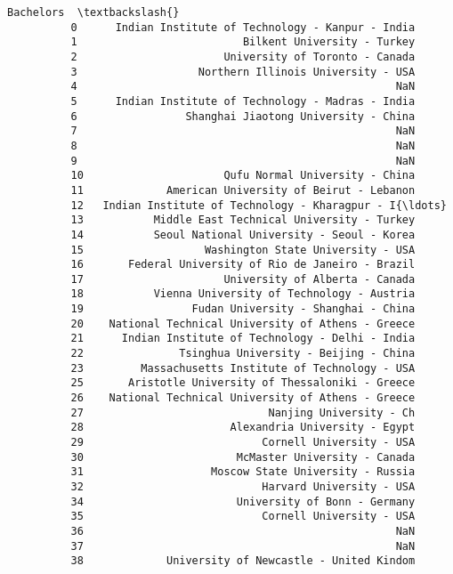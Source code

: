 \documentclass[11pt]{article}
\begin{document}
\begin{Verbatim}[commandchars=\\\{\}]
                                                       Bachelors  \textbackslash{}
          0      Indian Institute of Technology - Kanpur - India   
          1                          Bilkent University - Turkey   
          2                       University of Toronto - Canada   
          3                   Northern Illinois University - USA   
          4                                                  NaN   
          5      Indian Institute of Technology - Madras - India   
          6                 Shanghai Jiaotong University - China   
          7                                                  NaN   
          8                                                  NaN   
          9                                                  NaN   
          10                      Qufu Normal University - China   
          11             American University of Beirut - Lebanon   
          12   Indian Institute of Technology - Kharagpur - I{\ldots}   
          13           Middle East Technical University - Turkey   
          14           Seoul National University - Seoul - Korea   
          15                   Washington State University - USA   
          16       Federal University of Rio de Janeiro - Brazil   
          17                      University of Alberta - Canada   
          18           Vienna University of Technology - Austria   
          19                 Fudan University - Shanghai - China   
          20    National Technical University of Athens - Greece   
          21      Indian Institute of Technology - Delhi - India   
          22               Tsinghua University - Beijing - China   
          23         Massachusetts Institute of Technology - USA   
          25       Aristotle University of Thessaloniki - Greece   
          26    National Technical University of Athens - Greece   
          27                             Nanjing University - Ch   
          28                       Alexandria University - Egypt   
          29                            Cornell University - USA   
          30                        McMaster University - Canada   
          31                    Moscow State University - Russia   
          32                            Harvard University - USA   
          34                        University of Bonn - Germany   
          35                            Cornell University - USA   
          36                                                 NaN   
          37                                                 NaN   
          38             University of Newcastle - United Kindom   

\end{Verbatim}
\end{document}
